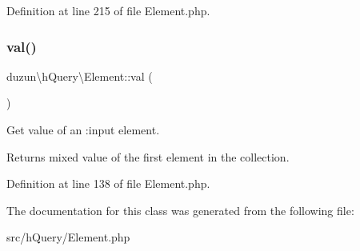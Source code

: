 Definition at line 215 of file Element.\+php.

\mbox{\label{classduzun_1_1hQuery_1_1Element_a0ec6920ccb04c246df8490afeb89baf4}} 
\subsubsection{\texorpdfstring{val()}{val()}}
{\footnotesize\ttfamily duzun\textbackslash{}h\+Query\textbackslash{}\+Element\+::val (\begin{DoxyParamCaption}{ }\end{DoxyParamCaption})}

Get value of an \+:input element.

\begin{DoxyReturn}{Returns}
mixed value of the first element in the collection. 
\end{DoxyReturn}


Definition at line 138 of file Element.\+php.



The documentation for this class was generated from the following file\+:\begin{DoxyCompactItemize}
\item 
src/h\+Query/Element.\+php\end{DoxyCompactItemize}
